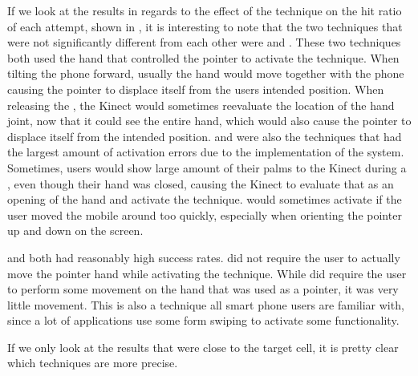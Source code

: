 If we look at the results in regards to the effect of the technique on the hit ratio of each attempt, shown in , it is interesting to note that the two techniques that were not significantly different from each other were \tilt and \pinch. These two techniques both used the hand that controlled the pointer to activate the technique. When tilting the phone forward, usually the hand would move together with the phone causing the pointer to displace itself from the users intended position. When releasing the \pinch, the Kinect would sometimes reevaluate the location of the hand joint, now that it could see the entire hand, which would also cause the pointer to displace itself from the intended position. \pinch and \tilt were also the techniques that had the largest amount of activation errors due to the implementation of the system. Sometimes, users would show large amount of their palms to the Kinect during a \pinch, even though their hand was closed, causing the Kinect to evaluate that as an opening of the hand and activate the technique. \tilt would sometimes activate if the user moved the mobile around too quickly, especially when orienting the pointer up and down on the screen.  

\swipe and \throw both had reasonably high success rates. \throw did not require the user to actually move the pointer hand while activating the technique. While \swipe did require the user to perform some movement on the hand that was used as a pointer, it was very little movement. This is also a technique all smart phone users are familiar with, since a lot of applications use some form swiping to activate some functionality.

If we only look at the results that were close to the target cell, it is pretty clear which techniques are more precise. 


